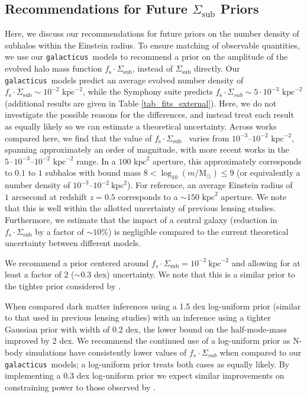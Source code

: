 \documentclass[%
 reprint,
 amsmath,
 amssymb,
 aps,
prd,
twocolumn,
superscriptaddress,
preprintnumbers,
floatfix,
nofootinbib
]{revtex4-2}
\def\gal{{\tt galacticus}~}
\def\fssigsub{{$f_{\mathrm{s}} \cdot \Sigma_{\mathrm{sub}}$}}
\newcommand{\reftable}[1]{Table \ref{#1}}
\begin{document}
\subsection{Recommendations for Future $\Sigma_{\mathrm{sub}}$ Priors}\label{sec_discuss_sigsub_prior}
Here, we discuss our recommendations for future priors on the number density of subhalos within the Einstein radius.
To ensure matching of observable quantities, we use our \gal models to recommend a prior on the amplitude of the evolved halo mass function $f_{\mathrm{s}} \cdot \Sigma_{\mathrm{sub}}$, instead of $\Sigma_{\mathrm{sub}}$ directly. 
Our \gal models predict an average evolved number density of $f_{\mathrm{s}} \cdot \Sigma_{\mathrm{sub}} \sim 10^{-2} \text{~kpc}^{-2}$, while the Symphony suite predicts $f_{\mathrm{s}} \cdot \Sigma_{sub} \sim 5 \cdot 10^{-3} \text{~kpc}^{-2}$ (additional results are given in \reftable{tab_fits_external}).
Here, we do not investigate the possible reasons for the differences, and instead treat each result as equally likely so we can estimate a theoretical uncertainty.
Across works compared here, we find that the value of \fssigsub~ varies from $10^{-3} \text{--} 10^{-2} \text{~kpc}^{-2}$, spanning approximately an order of magnitude, with more recent works in the $5 \cdot 10^{-3} \text{--} 10^{-2} \text{~kpc}^{-2}$ range.
In a $100 \text{~kpc}^2$ aperture, this approximately corresponds to $0.1$ to $1$ subhalos with bound mass $8 < \log_{10} (m / \mathrm{M}_\odot)  \leq 9$ (or equivalently a number density of $10^{-3} \text{--} 10^{-2} ~\text{kpc}^2$).
For reference, an average Einstein radius of $1 \text{~arcsecond}$ at redshift $z=0.5$ corresponds to a $\sim 150 \text{~kpc}^2$ aperture. 
We note that this is well within the allotted uncertainty of previous lensing studies.
Furthermore, we estimate that the impact of a central galaxy (reduction in $f_{\mathrm{s}} \cdot \Sigma_{\mathrm{sub}}$ by a factor of $\sim 10\%$) is negligible compared to the current theoretical uncertainty between different models.

We recommend a prior centered around $f_s \cdot \Sigma_{\mathrm{sub}} = 10^{-2} ~\text{kpc}^{-2}$ and allowing for at least a factor of $2$ ($\sim 0.3$ dex) uncertainty.
We note that this is a similar prior to the tighter prior considered by \citet{gilman2024turbocharging}.

When \citet{gilman2024turbocharging} compared dark matter inferences using a 1.5 dex log-uniform prior (similar to that used in previous lensing studies) with an inference using a tighter Gaussian prior with width of 0.2 dex, the lower bound on the half-mode-mass improved by 2 dex.
We recommend the continued use of a log-uniform prior as N-body simulations have consistently lower values of $f_s \cdot \Sigma_{sub}$ when compared to our \gal models; a log-uniform prior treats both cases as equally likely.
By implementing a 0.3 dex log-uniform prior we expect similar improvements on constraining power to those observed by \citet{gilman2024turbocharging}.
\end{document}
